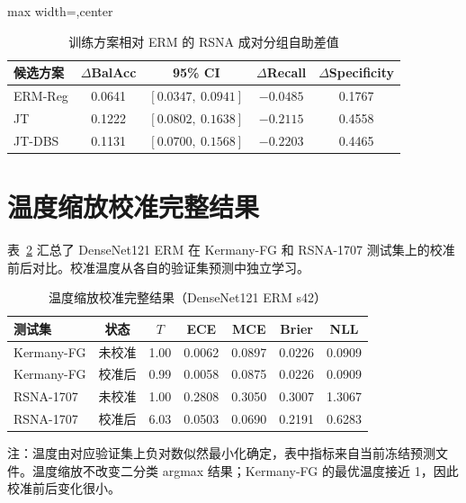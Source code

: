 \documentclass[12pt,a4paper,UTF8,openany]{ctexbook}
\begin{document}
\begin{table}[htbp]
\centering
\caption{训练方案相对 ERM 的 RSNA 成对分组自助差值}
\label{tab:paired_strategy_effects}
\renewcommand{\arraystretch}{1.25}
\begin{adjustbox}{max width=\textwidth,center}
\begin{tabular}{lcccc}
\toprule
\textbf{候选方案} & \textbf{$\Delta$BalAcc} & \textbf{95\% CI} & \textbf{$\Delta$Recall} & \textbf{$\Delta$Specificity} \\
\midrule
ERM-Reg & 0.0641 & $[0.0347,\ 0.0941]$ & $-0.0485$ & 0.1767 \\
JT & 0.1222 & $[0.0802,\ 0.1638]$ & $-0.2115$ & 0.4558 \\
JT-DBS & 0.1131 & $[0.0700,\ 0.1568]$ & $-0.2203$ & 0.4465 \\
\bottomrule
\end{tabular}
\end{adjustbox}
\end{table}

\section{温度缩放校准完整结果}

表~\ref{tab:supp_calibration} 汇总了 DenseNet121 ERM 在 Kermany-FG 和 RSNA-1707 测试集上的校准前后对比。校准温度从各自的验证集预测中独立学习。

\begin{table}[htbp]
\centering
\caption{温度缩放校准完整结果（DenseNet121 ERM s42）}
\label{tab:supp_calibration}
\renewcommand{\arraystretch}{1.3}
\begin{tabular}{lcccccc}
\toprule
\textbf{测试集} & \textbf{状态} & \textbf{$T$} & \textbf{ECE} & \textbf{MCE} & \textbf{Brier} & \textbf{NLL} \\
\midrule
Kermany-FG & 未校准 & 1.00 & 0.0062 & 0.0897 & 0.0226 & 0.0909 \\
Kermany-FG & 校准后 & 0.99 & 0.0058 & 0.0875 & 0.0226 & 0.0909 \\
\midrule
RSNA-1707 & 未校准 & 1.00 & 0.2808 & 0.3050 & 0.3007 & 1.3067 \\
RSNA-1707 & 校准后 & 6.03 & 0.0503 & 0.0690 & 0.2191 & 0.6283 \\
\bottomrule
\end{tabular}
\end{table}

注：温度由对应验证集上负对数似然最小化确定，表中指标来自当前冻结预测文件。温度缩放不改变二分类 argmax 结果；Kermany-FG 的最优温度接近 1，因此校准前后变化很小。
\end{document}
